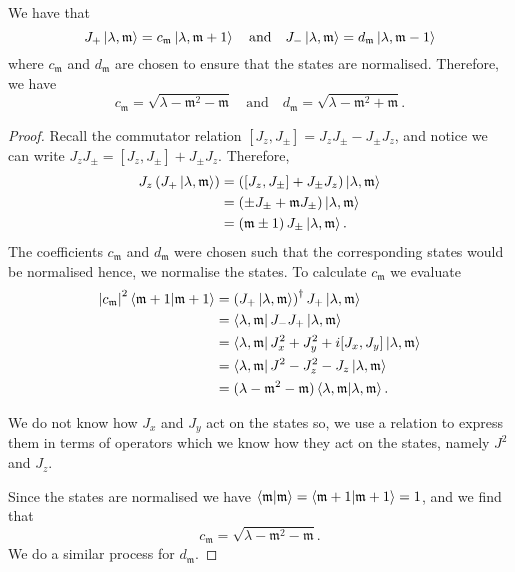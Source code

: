 \documentclass[12pt, a4paper]{article}
\begin{document}
\begin{mdprop}
    We have that 
    \[J_+\ket{\lambda,\mathfrak{m}}=c_{\mathfrak{m}}\ket{\lambda,\mathfrak{m}+1} \quad \text{and} \quad J_-\ket{\lambda,\mathfrak{m}} = d_{\mathfrak{m}}\ket{\lambda,\mathfrak{m}-1}\]
    where \(c_{\mathfrak{m}}\) and \(d_{\mathfrak{m}}\) are chosen to ensure that the states are normalised. Therefore, we have
    \[c_{\mathfrak{m}} = \sqrt{\lambda-\mathfrak{m}^2-\mathfrak{m}} \quad \text{and}\quad d_{\mathfrak{m}}=\sqrt{\lambda-\mathfrak{m}^2+\mathfrak{m}}.\]
\end{mdprop}

\begin{proof}
    Recall the commutator relation \([J_z,J_{\pm}]=J_zJ_{\pm}-J_{\pm}J_z\), and notice we can write \(J_zJ_{\pm}=[J_z,J_{\pm}]+J_{\pm}J_z\). Therefore,
    \[\begin{aligned}
        J_z\left(J_+\ket{\lambda,\mathfrak{m}} \right) &= \left( [J_z,J_{\pm}]+J_{\pm} J_z\right) \ket{\lambda,\mathfrak{m}} \\
        &= \left( \pm J_{\pm} +\mathfrak{m} J_{\pm} \right)\ket{\lambda,\mathfrak{m}} \\
        &= \left( \mathfrak{m}\pm 1 \right)J_{\pm}\ket{\lambda,\mathfrak{m}}.
    \end{aligned}\]
    The coefficients \(c_{\mathfrak{m}}\) and \(d_{\mathfrak{m}}\) were chosen such that the corresponding states would be normalised hence, we normalise the states. To calculate \(c_{\mathfrak{m}}\) we evaluate
    \[\begin{aligned}
        \abs{c_{\mathfrak{m}}}^2 \bra{\mathfrak{m}+1}\ket{\mathfrak{m}+1} &= \left( J_+\ket{\lambda, \mathfrak{m}} \right)^{\dagger} J_+\ket{\lambda, \mathfrak{m}} \\
        &= \bra{\lambda, \mathfrak{m}} J_- J_+ \ket{\lambda, \mathfrak{m}} \\
        &= \bra{\lambda, \mathfrak{m}} J_x^2 +J_y^2+i[J_x,J_y] \ket{\lambda, \mathfrak{m}} \\
        &= \bra{\lambda, \mathfrak{m}} J^2-J_z^2-J_z \ket{\lambda, \mathfrak{m}} \\
        &= (\lambda-\mathfrak{m}^2-\mathfrak{m} )  \bra{\lambda, \mathfrak{m}}\ket{\lambda, \mathfrak{m}}.
    \end{aligned}\]
    \begin{mdnote}
        We do not know how \(J_x\) and \(J_y\) act on the states so, we use a relation to express them in terms of operators which we know how they act on the states, namely \(J^2\) and \(J_z\).
    \end{mdnote}
    Since the states are normalised we have \(\bra{\mathfrak{m}}\ket{\mathfrak{m}}=\bra{\mathfrak{m}+1}\ket{\mathfrak{m}+1}=1\), and we find that 
    \[c_{\mathfrak{m}}= \sqrt{\lambda-\mathfrak{m}^2-\mathfrak{m}}.\]
    We do a similar process for \(d_{\mathfrak{m}}\).
\end{proof}
\end{document}
